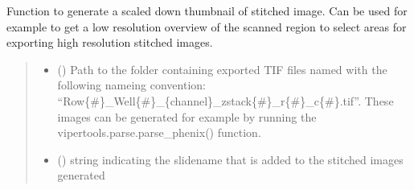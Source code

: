 \documentclass[a4paper,10pt,english,openany,oneside]{sphinxmanual}
\begin{document}
\begin{fulllineitems}
\label{\detokenize{pages/modules:vipertools.stitch.generate_stitched}}
\pysigstartsignatures
{}
\pysigstopsignatures
\sphinxAtStartPar
Function to generate a scaled down thumbnail of stitched image. Can be used for example to
get a low resolution overview of the scanned region to select areas for exporting high resolution
stitched images.
\begin{quote}\begin{description}
\begin{itemize}
\item {} 
\sphinxAtStartPar
{} () \textendash{} Path to the folder containing exported TIF files named with the following nameing convention: “Row\{\#\}\_Well\{\#\}\_\{channel\}\_zstack\{\#\}\_r\{\#\}\_c\{\#\}.tif”.
These images can be generated for example by running the vipertools.parse.parse\_phenix() function.

\item {} 
\sphinxAtStartPar
{} () \textendash{} string indicating the slidename that is added to the stitched images generated


\end{itemize}
\end{description}
\end{quote}
\end{fulllineitems}
\end{document}
